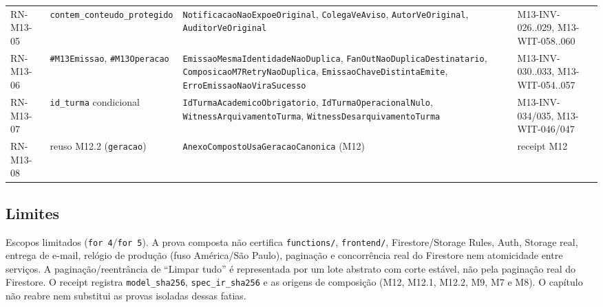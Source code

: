 \begin{longtable}{>{\raggedright\arraybackslash}p{} >{\raggedright\arraybackslash}p{} >{\raggedright\arraybackslash}p{} >{\raggedright\arraybackslash}p{}}
RN-M13-05 & \texttt{contem\_conteudo\_protegido} & \texttt{NotificacaoNaoExpoeOriginal}, \newline \texttt{ColegaVeAviso}, \newline \texttt{AutorVeOriginal}, \newline \texttt{AuditorVeOriginal} & M13-INV-026..029, \newline M13-WIT-058..060 \\
RN-M13-06 & \texttt{\#M13Emissao}, \texttt{\#M13Operacao} & \texttt{EmissaoMesmaIdentidadeNaoDuplica}, \newline \texttt{FanOutNaoDuplicaDestinatario}, \newline \texttt{ComposicaoM7RetryNaoDuplica}, \newline \texttt{EmissaoChaveDistintaEmite}, \newline \texttt{ErroEmissaoNaoViraSucesso} & M13-INV-030..033, \newline M13-WIT-054..057 \\
RN-M13-07 & \texttt{id\_turma} condicional & \texttt{IdTurmaAcademicoObrigatorio}, \newline \texttt{IdTurmaOperacionalNulo}, \newline \texttt{WitnessArquivamentoTurma}, \newline \texttt{WitnessDesarquivamentoTurma} & M13-INV-034/035, \newline M13-WIT-046/047 \\
RN-M13-08 & reuso M12.2 (\texttt{geracao}) & \texttt{AnexoCompostoUsaGeracaoCanonica} (M12) & receipt M12 \\
\bottomrule
\end{longtable}
\endgroup

\begingroup\small\raggedright

\par\endgroup

\subsection*{Limites}
Escopos limitados (\texttt{for 4}/\texttt{for 5}). A prova composta não
certifica \texttt{functions/}, \texttt{frontend/}, Firestore/Storage Rules, Auth,
Storage real, entrega de e-mail, relógio de produção (fuso
América/São Paulo), paginação e concorrência real do Firestore nem atomicidade
entre serviços. A paginação/reentrância de ``Limpar tudo'' é representada por um
lote abstrato com corte estável, não pela paginação real do Firestore. O receipt
registra \texttt{model\_sha256}, \texttt{spec\_ir\_sha256} e as origens de
composição (M12, M12.1, M12.2, M9, M7 e M8). O capítulo não reabre nem
substitui as provas isoladas dessas fatias.
\fussy

